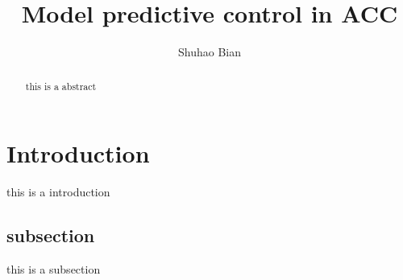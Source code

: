 \documentclass{article}
\title{Model predictive control in ACC}
\author{Shuhao Bian}
\numberwithin{equation}{section}
\begin{document}
\maketitle

\begin{abstract}
    this is a abstract
\end{abstract}

\section{Introduction}
this is a introduction

\subsection{subsection}
this is a subsection
\end{document}
